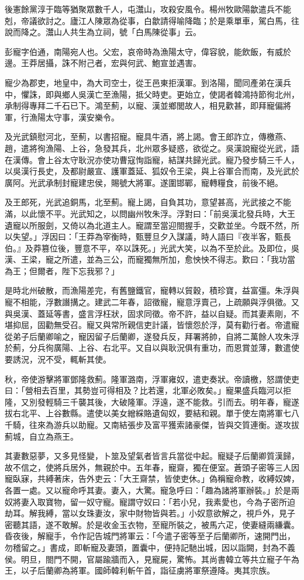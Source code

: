 \begin{pinyinscope}
後憲餘黨淳于臨等猶聚眾數千人，屯灊山，攻殺安風令。楊州牧歐陽歙遣兵不能剋，帝議欲討之。廬江人陳眾為從事，白歙請得喻降臨；於是乘單車，駕白馬，往說而降之。灊山人共生為立祠，號「白馬陳從事」云。

彭寵字伯通，南陽宛人也。父宏，哀帝時為漁陽太守，偉容貌，能飲飯，有威於邊。王莽居攝，誅不附己者，宏與何武、鮑宣並遇害。

寵少為郡吏，地皇中，為大司空士，從王邑東拒漢軍。到洛陽，聞同產弟在漢兵中，懼誅，即與鄉人吳漢亡至漁陽，抵父時吏。更始立，使謁者韓鴻持節徇北州，承制得專拜二千石已下。鴻至薊，以寵、漢並鄉閭故人，相見歡甚，即拜寵偏將軍，行漁陽太守事，漢安樂令。

及光武鎮慰河北，至薊，以書招寵。寵具牛酒，將上謁。會王郎詐立，傳檄燕、趙，遣將徇漁陽、上谷，急發其兵，北州眾多疑惑，欲從之。吳漢說寵從光武，語在漢傳。會上谷太守耿況亦使功曹寇恂詣寵，結謀共歸光武。寵乃發步騎三千人，以吳漢行長史，及都尉嚴宣、護軍蓋延、狐奴令王梁，與上谷軍合而南，及光武於廣阿。光武承制封寵建忠侯，賜號大將軍。遂圍邯鄲，寵轉糧食，前後不絕。

及王郎死，光武追銅馬，北至薊。寵上謁，自負其功，意望甚高，光武接之不能滿，以此懷不平。光武知之，以問幽州牧朱浮。浮對曰：「前吳漢北發兵時，大王遺寵以所服劍，又倚以為北道主人。寵謂至當迎閤握手，交歡並坐。今既不然，所以失望。」浮因曰：「王莽為宰衡時，甄豐旦夕入謀議，時人語曰『夜半客，甄長伯。』及莽篡位後，豐意不平，卒以誅死。」光武大笑，以為不至於此。及即位，吳漢、王梁，寵之所遣，並為三公，而寵獨無所加，愈怏怏不得志。歎曰：「我功當為王；但爾者，陛下忘我邪？」

是時北州破散，而漁陽差完，有舊鹽鐵官，寵轉以貿穀，積珍寶，益富彊。朱浮與寵不相能，浮數譖搆之。建武二年春，詔徵寵，寵意浮賣己，上疏願與浮俱徵。又與吳漢、蓋延等書，盛言浮枉狀，固求同徵。帝不許，益以自疑。而其妻素剛，不堪抑屈，固勸無受召。寵又與常所親信吏計議，皆懷怨於浮，莫有勸行者。帝遣寵從弟子后蘭卿喻之，寵因留子后蘭卿，遂發兵反，拜署將帥，自將二萬餘人攻朱浮於薊，分兵徇廣陽、上谷、右北平。又自以與耿況俱有重功，而恩賞並薄，數遣使要誘況，況不受，輒斬其使。

秋，帝使游擊將軍鄧隆救薊。隆軍潞南，浮軍雍奴，遣吏奏狀。帝讀檄，怒謂使吏曰：「營相去百里，其勢豈可得相及？比若還，北軍必敗矣。」寵果盛兵臨河以拒隆，又別發輕騎三千襲其後，大破隆軍。浮遠，遂不能救。引而去。明年春，寵遂拔右北平、上谷數縣。遣使以美女繒綵賂遺匈奴，要結和親。單于使左南將軍七八千騎，往來為游兵以助寵。又南結張步及富平獲索諸豪傑，皆與交質連衡。遂攻拔薊城，自立為燕王。

其妻數惡夢，又多見怪變，卜筮及望氣者皆言兵當從中起。寵疑子后蘭卿質漢歸，故不信之，使將兵居外，無親於中。五年春，寵齋，獨在便室。蒼頭子密等三人因寵臥寐，共縛著床，告外吏云：「大王齋禁，皆使吏休。」偽稱寵命教，收縛奴婢，各置一處。又以寵命呼其妻。妻入，大驚。寵急呼曰：「趣為諸將軍辦裝。」於是兩奴將妻入取寶物，留一奴守寵。寵謂守奴曰：「若小兒，我素愛也，今為子密所迫劫耳。解我縛，當以女珠妻汝，家中財物皆與若。」小奴意欲解之，視戶外，見子密聽其語，遂不敢解。於是收金玉衣物，至寵所裝之，被馬六疋，使妻縫兩縑囊。昏夜後，解寵手，令作記告城門將軍云：「今遣子密等至子后蘭卿所，速開門出，勿稽留之。」書成，即斬寵及妻頭，置囊中，便持記馳出城，因以詣闕，封為不義侯。明旦，閤門不開，官屬踰牆而入，見寵屍，驚怖。其尚書韓立等共立寵子午為王，以子后蘭卿為將軍。國師韓利斬午首，詣征虜將軍祭遵降。夷其宗族。


\end{pinyinscope}
